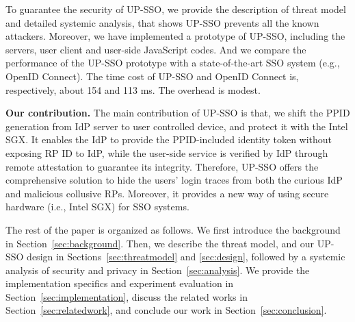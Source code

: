 To guarantee the security of UP-SSO, we provide the description of threat model and detailed systemic analysis, that shows UP-SSO prevents all the known attackers. Moreover, we have implemented a prototype of UP-SSO, including the servers, user client and user-side JavaScript codes. And we compare the performance of the UP-SSO prototype with a state-of-the-art SSO system (e.g., OpenID Connect). The time cost of UP-SSO and OpenID Connect is, respectively, about 154 and 113 ms. The overhead is modest.


\begin{comment}
We summarize our contributions as follows.
\begin{itemize}
\item We propose the comprehensive solution to hide the users' login traces from both the curious IdP and malicious collusive RPs for convenient SSO system.
\item We formally analyze the security of XXX and show that it guarantees the security, while the users' login traces are well protected.
\item We have implemented a prototype of XXX, and compare the performance of the UP-SSO prototype with the state-of-the-art SSO systems (e.g., OIDC), and demonstrate its efficiency.
\end{itemize}
\end{comment}

\vspace{3mm}\noindent\textbf{Our contribution. }The main contribution of UP-SSO is that, we shift the PPID generation from IdP server to user controlled device, and protect it with the Intel SGX. It enables the IdP to provide the PPID-included identity token without exposing RP ID to IdP, while the user-side service is verified by IdP through remote attestation to guarantee its integrity.  
Therefore, UP-SSO offers the comprehensive solution to hide the users' login traces from both the curious IdP and malicious collusive RPs. 
Moreover, it provides a new way of using secure hardware (i.e., Intel SGX) for SSO systems.

The rest of the paper is organized as follows. We first introduce the background in Section~\ref{sec:background}. Then, we describe the threat model, and our UP-SSO design in Sections~\ref{sec:threatmodel} and \ref{sec:design}, followed by a systemic analysis of security and privacy in Section~\ref{sec:analysis}. We provide the implementation specifics and experiment evaluation in Section~\ref{sec:implementation}, discuss the related works in Section~\ref{sec:relatedwork}, and conclude our work in Section~\ref{sec:conclusion}.
